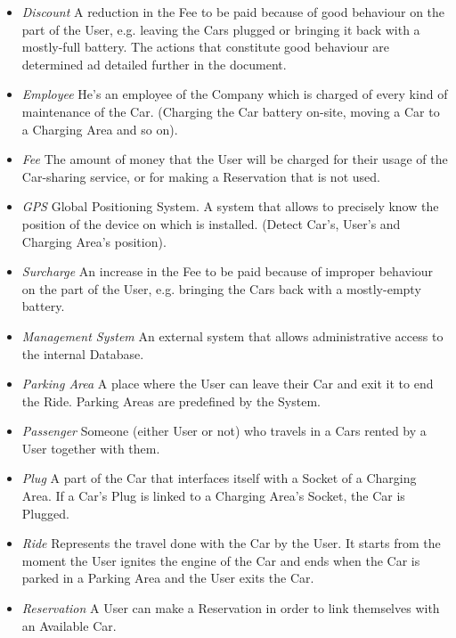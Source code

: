 \begin{itemize}
	\item \emph{Discount}
	A reduction in the Fee to be paid because of good behaviour on the part of the User, e.g. leaving the Cars plugged or bringing it back with a mostly-full battery. The actions that constitute good behaviour are determined ad detailed further in the document.

	\item \emph{Employee}
	He's an employee of the Company which is charged of every kind of maintenance of the Car. (Charging the Car battery on-site, moving a Car to a Charging Area and so on). 

	\item \emph{Fee}
	The amount of money that the User will be charged for their usage of the Car-sharing service, or for making a Reservation that is not used.

	\item \emph{GPS}
	Global Positioning System. A system that allows to precisely know the position of the device on which is installed. (Detect Car's, User's and Charging Area's position).


	\item \emph{Surcharge}
	An increase in the Fee to be paid because of improper behaviour on the part of the User, e.g. bringing the Cars back with a mostly-empty battery.

	\item \emph{Management System}
	An external system that allows administrative access to the internal Database.

	\item \emph{Parking Area}
	A place where the User can leave their Car and exit it to end the Ride. Parking Areas are predefined by the System.

	\item \emph{Passenger}
	Someone (either User or not) who travels in a Cars rented by a User together with them.

	\item \emph{Plug}
	A part of the Car that interfaces itself with a Socket of a Charging Area. If a Car's Plug is linked to a Charging Area's Socket, the Car is Plugged.

	\item \emph{Ride}
	Represents the travel done with the Car by the User. It starts from the moment the User ignites the engine of the Car and ends when the Car is parked in a Parking Area and the User exits the Car.

	\item \emph{Reservation}
	A User can make a Reservation in order to link themselves with an Available Car.


\end{itemize}
